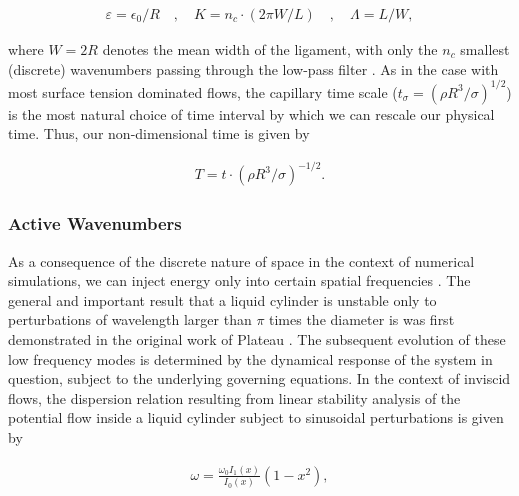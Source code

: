 \begin{align}
 \varepsilon = \epsilon_0 / R \quad , \quad K = n_c \cdot \left(2\pi W/ L \right) \quad
	, \quad \Lambda = L / W , 
\end{align}

where $W = 2R$ denotes the mean width of the ligament, with only
the $n_c$ smallest (discrete) wavenumbers passing through the low-pass filter .
As in the case with most surface tension dominated flows, 
the capillary time scale ($t_\sigma = (\rho R^3 / \sigma)^{1/2}$) is the most 
natural choice of time interval by which we can rescale our physical time.
Thus, our non-dimensional time is given by 

\begin{align}
	T = t \cdot \left(\rho R^3 / \sigma \right)^{-1/2} . 
\end{align}


\subsubsection*{Active Wavenumbers}

As a consequence of the discrete nature of space in
the context of numerical simulations, we can inject energy
only into certain spatial frequencies . 
The general and important result that a liquid cylinder is unstable 
only to perturbations of wavelength larger than $\pi$ times the diameter
is was first demonstrated in the original work of Plateau \cite{plateau1849}.
The subsequent evolution of these low frequency modes  
is determined by the dynamical response of the system in question, 
subject to the underlying governing equations. 
In the context of inviscid flows, the dispersion relation
resulting from linear stability analysis of the potential flow
inside a liquid cylinder subject to sinusoidal perturbations is given by

\begin{align}
\omega = \frac{\omega_0 I_1(x)}{I_0(x)} \left(1 - x^2 \right) , 
\label{rayleigh_plateau}
\end{align}
 
